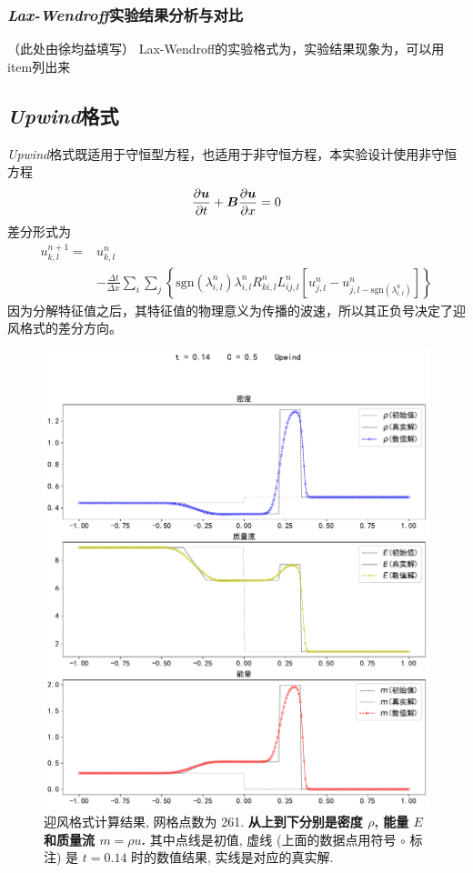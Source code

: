 \documentclass[10.5pt
]{article}
\begin{document}
\subsubsection{\textit{Lax-Wendroff}实验结果分析与对比}
（此处由徐均益填写）
Lax-Wendroff的实验格式为，实验结果现象为，可以用item列出来
\subsection{\textit{Upwind}格式}
\textit{Upwind}格式既适用于守恒型方程，也适用于非守恒方程，本实验设计使用非守恒方程
\begin{align}
\pdv{\vb*u}{t} + \vb*B \pdv{\vb*u}{x} = 0
\end{align}
差分形式为
\begin{align}
u_{k,l}^{n+1} =& u_{k,l}^n \nonumber\\
& - \frac{\Delta t}{\Delta x} \sum_i \sum_j \left\{\text{sgn}(\lambda_{i,l}^n)
 \lambda_{i,l}^n R_{ki,l}^n L_{ij,l}^n \left[u_{j,l}^n - u_{j,l-\text{sgn}(\lambda_{i,l}^n)}^n\right]\right\}
\end{align}
因为分解特征值之后，其特征值的物理意义为传播的波速，所以其正负号决定了迎风格式的差分方向。

\begin{figure}
\begin{center}
\includegraphics[width=.85\textwidth]{figures/upwind261.pdf}
\caption{迎风格式计算结果, 网格点数为 261. \textbf{从上到下分别是密度 $\rho$, 能量 $E$ 和质量流 $m = \rho u$.}
其中点线是初值, 虚线 (上面的数据点用符号 $\circ$ 标注) 是 $t=0.14$ 时的数值结果, 实线是对应的真实解.}\label{Fig:Upwind}
\end{center}
\end{figure}
\end{document}
